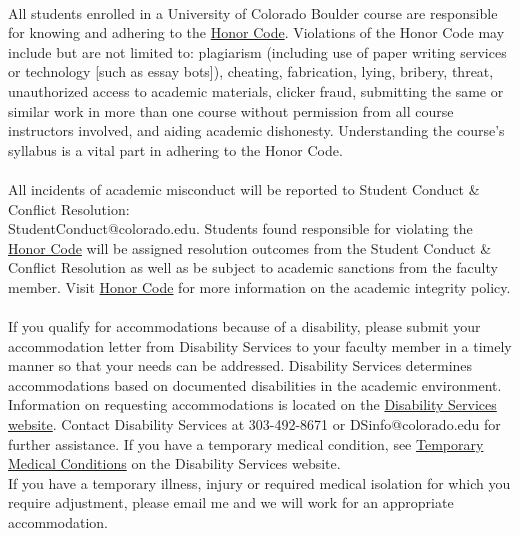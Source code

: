 \documentclass[11pt]{article}
\begin{document}
\\
All students enrolled in a University of Colorado Boulder course are responsible for knowing and adhering to the \href{https://www.colorado.edu/sccr/media/229}{Honor Code}. Violations of the Honor Code may include but are not limited to: plagiarism (including use of paper writing services or technology [such as essay bots]), cheating, fabrication, lying, bribery, threat, unauthorized access to academic materials, clicker fraud, submitting the same or similar work in more than one course without permission from all course instructors involved, and aiding academic dishonesty. Understanding the course's syllabus is a vital part in adhering to the Honor Code.\\
\\
All incidents of academic misconduct will be reported to Student Conduct \& Conflict Resolution: \\StudentConduct@colorado.edu. Students found responsible for violating the \href{https://www.colorado.edu/sccr/media/229}{Honor Code} will be assigned resolution outcomes from the Student Conduct \& Conflict Resolution as well as be subject to academic sanctions from the faculty member. Visit \href{https://www.colorado.edu/sccr/media/229}{Honor Code} for more information on the academic integrity policy. \\

\\
If you qualify for accommodations because of a disability, please submit your accommodation letter from Disability Services to your faculty member in a timely manner so that your needs can be addressed.  Disability Services determines accommodations based on documented disabilities in the academic environment.  Information on requesting accommodations is located on the \href{https://www.colorado.edu/disabilityservices/}{Disability Services website}. Contact Disability Services at 303-492-8671 or DSinfo@colorado.edu  for further assistance.  If you have a temporary medical condition, see \href{https://www.colorado.edu/disabilityservices/students/temporary-medical-conditions}{Temporary Medical Conditions} on the Disability Services website.\\
If you have a temporary illness, injury or required medical isolation for which you require adjustment, please email me and we will work for an appropriate accommodation.\\
\end{document}

